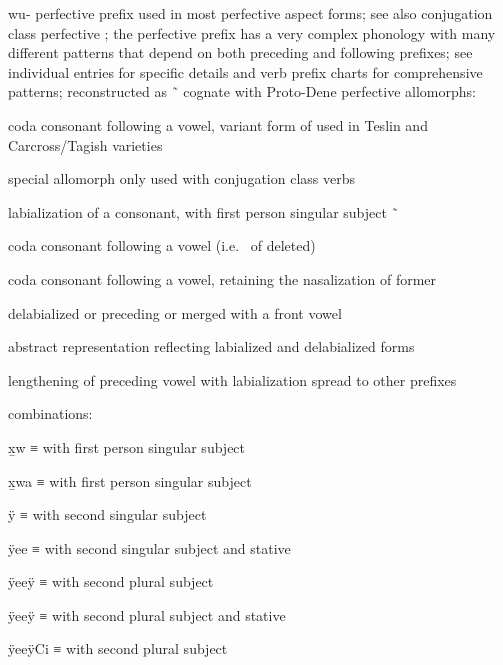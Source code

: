 \begin{morphdesc}[resume*=alphalist]
\item[wu-]\label{m:wu-}
	perfective prefix used in most perfective aspect forms;
	see also  conjugation class perfective ;
	the perfective prefix has a very complex phonology with many different patterns that depend
	on both	preceding and following prefixes;
	see individual entries for specific details and verb prefix charts for comprehensive patterns;
	reconstructed as  \~\  cognate with Proto-Dene  perfective
	\newline
	allomorphs:
	\begin{allolist}
	\item[\X{m-}]	coda consonant following a vowel, variant form of  used in Teslin
			and Carcross/Tagish varieties
	\item[{\X[u-pfv]{u-}}]
			special allomorph only used with  conjugation class verbs
	\item[{\X[ʷ-pfv]{ʷ-}}]
			labialization of a consonant, with first person singular subject  \~\ 
	\item[{\X[w-pfv]{w-}}]
			coda consonant following a vowel (i.e.\  of  deleted)
	\item[\X{w̃-}]	coda consonant following a vowel, retaining the nasalization of former 
	\item[{\X[ÿ-pfv]{ÿ-}}]
			delabialized  or  preceding or merged with a front vowel
	\item[\X{ÿu-}]	abstract representation reflecting labialized and delabialized forms
	\item[\X{μʷ-}]	lengthening of preceding vowel with labialization spread to other prefixes
	\end{allolist}
	combinations:
	\begin{allolist}
	\item[x̱w]	≡  with first person singular subject \fm{x̱-}
	\item[x̱wa]	≡  with first person singular subject \fm{x̱a-}
	\item[ÿ]	≡  with second singular subject \X[i-2sg]{i-}
	\item[ÿee]	≡  with second singular subject \X[i-2sg]{i-}
			and stative \X{μ-}
	\item[ÿeeÿ]	≡  with second plural subject \X{ÿi-}
	\item[ÿeeÿ]	≡  with second plural subject \X{ÿi-}
			and stative \X{μ-}
	\item[ÿeeÿCi]	≡  with second plural subject \X{ÿi-}

\end{allolist}
\end{morphdesc}
